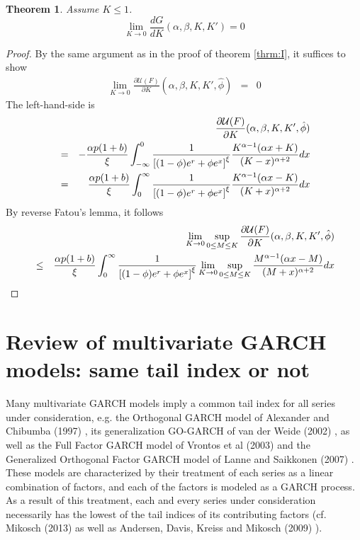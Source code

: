\documentclass{article}
\newcommand{\td}[2]{
  \frac{d #1}{d #2}
}
\newcommand{\pd}[2]{
  \frac{\partial #1}{\partial #2}
}
\newcommand{\1}[1]{
  \mathbf{1}_{\{#1\}}
}
\newtheorem{theorem}{Theorem}
\begin{document}
\begin{theorem}
  Assume $K \leq 1$.
  \[
  \lim_{K \to 0} \td{G}{K}(\alpha, \beta, K, K') = 0
  \]
\end{theorem}
\begin{proof}
  By the same argument as in the proof of theorem \ref{thrm:I}, it
  suffices to show
  \begin{eqnarray*}
    \lim_{K \to 0}
    \pd{\mathcal U(F)}{K}(\alpha, \beta, K, K', \hat \phi) &=& 0
  \end{eqnarray*}
  The left-hand-side is
  \begin{eqnarray*}
    && \pd{\mathcal U(F)}{K}(\alpha, \beta, K, K', \hat \phi) \\
    &=&
    -{\alpha p (1 + b) \over \xi}
    \int_{-\infty}^0
    {
      1 \over
      \left[
        (1 - \phi) e^r + \phi e^x
      \right]^\xi
    }
    {
      K^{\alpha - 1}
      (\alpha x + K)
      \over
      (K - x)^{\alpha + 2}
    } dx  \\
    &=&
    {\alpha p (1 + b) \over \xi}
    \int_0^{\infty}
    {
      1 \over
      \left[
        (1 - \phi) e^r + \phi e^x
      \right]^\xi
    }
    {
      K^{\alpha - 1}
      (\alpha x - K)
      \over
      (K + x)^{\alpha + 2}
    } dx
  \end{eqnarray*}
  By reverse Fatou's lemma, it follows
  \begin{eqnarray*}
    &&
    \lim_{K \to 0} \sup_{0 \leq M \leq K}
    \pd{\mathcal U(F)}{K}(\alpha, \beta, K, K', \hat \phi) \\
    &\leq&
    {\alpha p (1 + b) \over \xi}
    \int_0^{\infty}
    {
      1 \over
      \left[
        (1 - \phi) e^r + \phi e^x
      \right]^\xi
    }
    \lim_{K \to 0} \sup_{0 \leq M \leq K}
    {
      M^{\alpha - 1}
      (\alpha x - M)
      \over
      (M + x)^{\alpha + 2}
    } dx
  \end{eqnarray*}
\end{proof}
\section{Review of multivariate GARCH models:
  same tail index or not}
Many multivariate GARCH models imply a common tail index for all
series under consideration, e.g. the Orthogonal GARCH model of
Alexander and Chibumba (1997) \cite{alexander1997multivariate}, its
generalization GO-GARCH of van der Weide (2002) \cite{van2002go}, as
well as the Full Factor GARCH model of Vrontos et al (2003)
\cite{vrontos2003full} and the Generalized Orthogonal Factor GARCH
model of Lanne and Saikkonen (2007) \cite{lanne2007modeling}. These
models are characterized by their treatment of each series as a linear
combination of factors, and each of the factors is modeled as a GARCH
process. As a result of this treatment, each and every series under
consideration necessarily has the lowest of the tail indices of its
contributing factors (cf. Mikosch (2013) \cite{Mikosch2013} as well
as Andersen, Davis, Kreiss and Mikosch (2009)
\cite{andersen2009handbook}).
\end{document}
